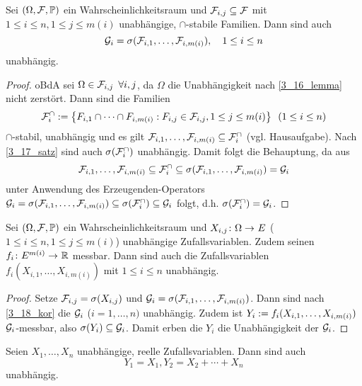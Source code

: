 \begin{korollar}	\label{3_18_kor}
	Sei $(\Omega,\mathcal{F},\mathbb{P})$ ein Wahrscheinlichkeitsraum und $\mathcal{F}_{i,j} \subseteq \mathcal{F}$ mit $1 \le i \le n, 1 \le j \le m(i)$ unabhängige, $\cap$-stabile Familien.
	Dann sind auch
	\begin{equation*}
		\mathcal{G}_i = \sigma(\mathcal{F}_{i,1}, \dots , \mathcal{F}_{i,m(i)}), \quad 1 \le i \le n
	\end{equation*}
	unabhängig.
\end{korollar}
\begin{proof}
	oBdA sei $\Omega \in \mathcal{F}_{i,j} \enskip \forall i,j$, da $\Omega$ die Unabhängigkeit nach \cref{3_16_lemma} nicht zerstört.
	Dann sind die Familien 
	\begin{equation*}
		\mathcal{F}_i^\cap \mathrel{:=} \left\{ F_{i,1} \cap \cdots \cap F_{i,m(i)} : F_{i,j} \in \mathcal{F}_{i,j}, 1 \le j \le m(i) \right\} \enskip (1 \le i \le n)
	\end{equation*}
	$\cap$-stabil, unabhängig und es gilt $\mathcal{F}_{i,1}, \dots , \mathcal{F}_{i,m(i)} \subseteq \mathcal{F}_i^\cap$ (vgl. Hausaufgabe). Nach \cref{3_17_satz} sind auch $\sigma(\mathcal{F}_i^\cap)$ unabhängig. Damit folgt die Behauptung, da aus 
	\begin{equation*}
		\mathcal{F}_{i,1}, \dots , \mathcal{F}_{i,m(i)} \subseteq \mathcal{F}_i^\cap \subseteq \sigma(\mathcal{F}_{i,1}, \dots , \mathcal{F}_{i,m(i)}) = \mathcal{G}_i
	\end{equation*} unter Anwendung des Erzeugenden-Operators $\mathcal{G}_i = \sigma(\mathcal{F}_{i,1}, \dots , \mathcal{F}_{i,m(i)}) \subseteq \sigma(\mathcal{F}_i^\cap) \subseteq \mathcal{G}_i$ folgt, d.h. $\sigma(\mathcal{F}_i^\cap) = \mathcal{G}_i$.
\end{proof}

\begin{korollar} \label{3_19_korollar}
	Sei $(\Omega,\mathcal{F},\mathbb{P})$ ein Wahrscheinlichkeitsraum und $\abb{X_{i,j}}{\Omega}{E}$ ($1 \le i \le n, 1 \le j \le m(i)$)
	unabhängige Zufallsvariablen. Zudem seinen $\abb{f_i}{E^{m(i)}}{\R}$ messbar. Dann sind auch die Zufallsvariablen $f_i(X_{i,1}, \dots, X_{i,m(i)})$ mit $1 \le i \le n$ unabhängig.
\end{korollar}
\begin{proof}
	Setze $\mathcal{F}_{i,j} = \sigma(X_{i,j})$ und $\mathcal{G}_i = \sigma(\mathcal{F}_{i,1} , \dots , \mathcal{F}_{i,m(i)})$. Dann sind nach \cref{3_18_kor} die $\mathcal{G}_i$ ($i = 1, \dots , n)$ unabhängig. Zudem ist $Y_i \mathrel{:=} f_i(X_{i,1}, \dots , X_{i,m(i)})$ $\mathcal{G}_i$-messbar, also $\sigma(Y_i) \subseteq \mathcal{G}_i$. Damit erben die $Y_i$ die Unabhängigkeit der $\mathcal{G}_i$.
\end{proof}

\begin{beispiel}
	Seien $X_1, \dots, X_n$ unabhängige, reelle Zufallsvariablen. Dann sind auch
	\begin{equation*}
	Y_1 = X_1, Y_2 = X_2 + \cdots + X_n
	\end{equation*}
	unabhängig.
\end{beispiel}

